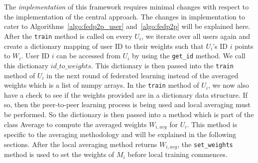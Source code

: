 \documentclass[12pt]{article}
\begin{document}
\\\\
The \textit{implementation} of this framework requires minimal changes with respect to the implementation of the central approach. The changes in implementation to cater to Algorithms~\ref{algo:fedp2p_user} and~\ref{algo:fedp2p} will be explained here. After the \texttt{train} method is called on every $U_i$, we iterate over all users again and create a dictionary mapping of user ID to their weights such that $U_i$'s ID $i$ points to $W_i$. User ID $i$ can be accessed from $U_i$ by using the \texttt{get\_id} method. We call this dictionary $id\_to\_weights$. This dictionary is then passed into the \texttt{train} method of $U_i$ in the next round of federated learning instead of the averaged weights which is a list of numpy arrays. In the \texttt{train} method of $U_i$, we now also have a check to see if the weights provided are in a dictionary data structure. If so, then the peer-to-peer learning process is being used and local averaging must be performed. So the dictionary is then passed into a method which is part of the class Average to compute the averaged weights $W_{i,avg}$ for $U_i$. This method is specific to the averaging methodology and will be explained in the following sections. After the local averaging method returns $W_{i,avg}$, the \texttt{set\_weights} method is used to set the weights of $M_i$ before local training commences. 
\end{document}
